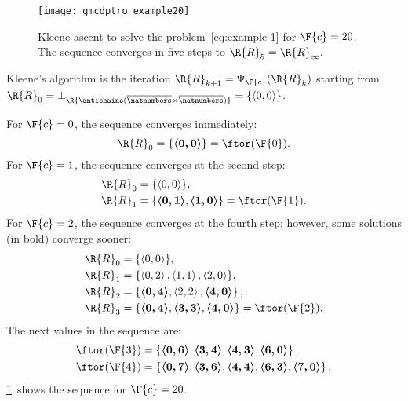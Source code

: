 \begin{figure}
  \begin{centering}
    \texttt{[image: gmcdptro\_example20]}
  \end{centering}
  \caption{\label{fig:example24}Kleene ascent to solve the problem~\cref{eq:example-1}
  for $\F{c}=20$. The sequence converges in five steps to $\R{R}_{5}=\R{R}_{\infty}.$ }
\end{figure}

\noindent Kleene's algorithm is the iteration $\R{R}_{k+1}=\Psi_{\F{c}}(\R{R}_{k})$
starting from $\R{R}_{0}=\bot_{\R{\antichains(\overline{\natnumbers}\times\overline{\natnumbers})}}=\{\left\langle 0,0\right\rangle \}$.

\noindent For $\F{c}=0$, the sequence converges immediately:
\[
  \R{R}_{0}=\{\boldsymbol{\left\langle 0,0\right\rangle }\}=\ftor(\F{0}).
\]
For $\F{c}=1$, the sequence converges at the second step:
\begin{align*}
  \R{R}_{0} & =\{\left\langle 0,0\right\rangle \},\\
  \R{R}_{1} & =\{\boldsymbol{\left\langle 0,1\right\rangle },\boldsymbol{\left\langle 1,0\right\rangle }\}=\ftor(\F{1}).
\end{align*}
For $\F{c}=2$, the sequence converges at the fourth step; however,
some solutions (in bold) converge sooner:
\begin{align*}
  \R{R}_{0} & =\{\left\langle 0,0\right\rangle \},\\
  \R{R}_{1} & =\{\left\langle 0,2\right\rangle ,\left\langle 1,1\right\rangle ,\left\langle 2,0\right\rangle \},\\
  \R{R}_{2} & =\left\{ \boldsymbol{\left\langle 0,4\right\rangle },\left\langle 2,2\right\rangle ,\boldsymbol{\left\langle 4,0\right\rangle }\right\} ,\\
  \R{R}_{3} & =\{\boldsymbol{\left\langle 0,4\right\rangle },\boldsymbol{\left\langle 3,3\right\rangle },\boldsymbol{\left\langle 4,0\right\rangle }\}=\ftor(\F{2}).
\end{align*}
The next values in the sequence are:
\begin{align*}
  \ftor(\F{3}) & =\left\{ \boldsymbol{\left\langle 0,6\right\rangle },\boldsymbol{\left\langle 3,4\right\rangle },\boldsymbol{\left\langle 4,3\right\rangle },\boldsymbol{\left\langle 6,0\right\rangle }\right\} ,\\
  \ftor(\F{4}) & =\left\{ \boldsymbol{\left\langle 0,7\right\rangle },\boldsymbol{\left\langle 3,6\right\rangle },\boldsymbol{\left\langle 4,4\right\rangle },\boldsymbol{\left\langle 6,3\right\rangle },\boldsymbol{\left\langle 7,0\right\rangle }\right\} .
\end{align*}
\cref{fig:example24}~shows the sequence for $\F{c}=20$.

